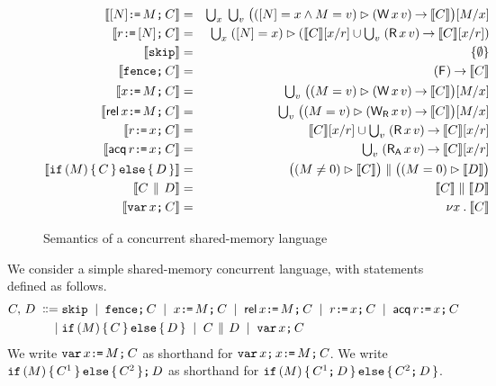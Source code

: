 \begin{figure*}
\begin{eqnarray*}
  \sem{[\bExp]\GETS\aExp\SEMI \aCmd} & = & \textstyle\bigcup_\aLoc\; \textstyle\bigcup_\aVal\;
  \bigl(([\bExp]=\aLoc \land \aExp=\aVal) \guard (\DW\aLoc\aVal) \prefix \sem{\aCmd}\bigr)[\aExp/\aLoc] \\
  \sem{\aReg\GETS[\bExp]\SEMI \aCmd} & = & \textstyle\bigcup_\aLoc\;
  ([\bExp]=\aLoc) \guard (\sem{\aCmd}[\aLoc/\aReg] \cup \textstyle\bigcup_\aVal\; (\DR\aLoc\aVal) \prefix \sem{\aCmd}[\aLoc/\aReg]) \\
  \sem{\SKIP} & = & \{ \emptyset \} \\
  \sem{\FENCE\SEMI \aCmd} & = & (\DF{}) \prefix \sem{\aCmd} \\
  \sem{\aLoc\GETS\aExp\SEMI \aCmd} & = & \textstyle\bigcup_\aVal\; \bigl((\aExp=\aVal) \guard (\DW\aLoc\aVal) \prefix \sem{\aCmd}\bigr)[\aExp/\aLoc] \\
  \sem{\REL\aLoc\GETS\aExp\SEMI \aCmd} & = & \textstyle\bigcup_\aVal\; \bigl((\aExp=\aVal) \guard (\DWRel\aLoc\aVal) \prefix \sem{\aCmd}\bigr)[\aExp/\aLoc] \\
  \sem{\aReg\GETS\aLoc\SEMI \aCmd} & = & \sem{\aCmd}[\aLoc/\aReg] \cup \textstyle\bigcup_\aVal\; (\DR\aLoc\aVal) \prefix \sem{\aCmd}[\aLoc/\aReg] \\
  \sem{\ACQ\aReg\GETS\aLoc\SEMI \aCmd} & = & \textstyle\bigcup_\aVal\; (\DRAcq\aLoc\aVal) \prefix \sem{\aCmd}[\aLoc/\aReg] \\
  \sem{\IF (\aExp) \THEN \aCmd \ELSE \bCmd \FI} & = & \bigl((\aExp \neq 0) \guard \sem{\aCmd}\bigr) \parallel \bigl((\aExp=0) \guard \sem{\bCmd}\bigr) \\
  \sem{\aCmd \PAR \bCmd} & = & \sem{\aCmd} \parallel \sem{\bCmd} \\
  \sem{\VAR\aLoc\SEMI \aCmd} & = & \nu \aLoc \st \sem{\aCmd}
\end{eqnarray*}
\caption{Semantics of a concurrent shared-memory language}
\label{fig:programs}
\end{figure*}

We consider a simple shared-memory concurrent language, with statements defined as follows.
\begin{align*}
C,\,D
\;\mathrel{\mathord{\vcentcolon}\mkern-1mu\mathord{\vcentcolon}\mathord{{=}}}\;& \texttt{skip}
\;\mathrel{|}\; \texttt{fence}\texttt{;}\, C
\;\mathrel{|}\; x\texttt{:}\mkern-1mu\texttt{=}\,M\texttt{;}\, C
\;\mathrel{|}\; \mathsf{rel}\,x\texttt{:}\mkern-1mu\texttt{=}\,M\texttt{;}\, C
\;\mathrel{|}\; r\texttt{:}\mkern-1mu\texttt{=}\,x\texttt{;}\, C
\;\mathrel{|}\; \mathsf{acq}\,r\texttt{:}\mkern-1mu\texttt{=}\,x\texttt{;}\, C \\
\;\mathrel{|}\;& \texttt{if}\, (M) \allowbreak\,\{\, C \,\}\,\allowbreak\texttt{else}\allowbreak\,\{\, D \,\}
\;\mathrel{|}\; C \,\mathbin{\|}\, D
\;\mathrel{|}\; \texttt{var}\,x\texttt{;}\, C
\end{align*}
We write $\texttt{var}\,x\texttt{:}\mkern-1mu\texttt{=}\,M\texttt{;}\, C$ as shorthand for $\texttt{var}\,x\texttt{;}\,x\texttt{:}\mkern-1mu\texttt{=}\,M\texttt{;}\, C$.
We write $\texttt{if}\, (M) \allowbreak\,\{\, C^1 \,\}\,\allowbreak\texttt{else}\allowbreak\,\{\, C^2 \,\} \texttt{;}\, D$ as
shorthand for $\texttt{if}\, (M) \allowbreak\,\{\, C^1 \texttt{;}\, D\,\}\,\allowbreak\texttt{else}\allowbreak\,\{\, C^2 \texttt{;}\, D\,\}$.

